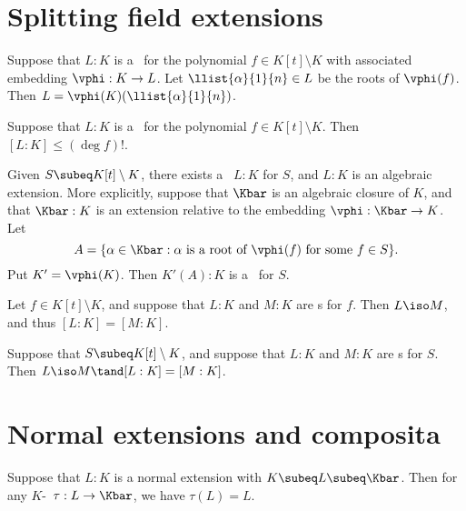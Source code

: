 \documentclass{article}
\begin{document}
\section{Splitting field extensions}
  \begin{tproposition}
    Suppose that \( L:K \) is a \sfe~for the polynomial \( f\in K[t]\setminus K \) with associated embedding \( \vphi:K\to L \). Let \( \llist{\alpha}{1}{n}\in L \) be the roots of \( \vphi(f) \). Then \( L=\vphi(K)(\llist{\alpha}{1}{n}) \).
  \end{tproposition}

  \begin{tproposition}
    Suppose that \( L:K \) is a \sfe~for the polynomial \( f\in K[t]\setminus K \). Then \( [L:K]\leq (\deg f)! \).
  \end{tproposition}

  \begin{tproposition}
    Given \( S\subeq K[t]\setminus K \), there exists a \sfe~\( L:K \) for \( S \), and \( L:K \) is an algebraic extension. More explicitly, suppose that \( \Kbar \) is an algebraic closure of \( K \), and that \( \Kbar:K \) is an extension relative to the embedding \( \vphi:\Kbar\to K \). Let
    \[
      A=\{ \alpha\in \Kbar : \alpha\text{ is a root of } \vphi(f) \text{ for some } f\in S \}.
    \]
    Put \( K'=\vphi(K) \). Then \( K'(A):K \) is a \sfe~for \( S \).
  \end{tproposition}

  \begin{ttheorem}
    Let \( f\in K[t]\setminus K \), and suppose that \( L:K \) and \( M:K \) are \sfe s for \( f \). Then \( L\iso M \), and thus \( [L:K]=[M:K] \).
  \end{ttheorem}

  \begin{ttheorem}
    Suppose that \( S\subeq K[t]\setminus K \), and suppose that \( L:K \) and \( M:K \) are \sfe s for \( S \). Then \( L\iso M\tand [L:K]=[M:K] \).
  \end{ttheorem}

\section{Normal extensions and composita}
  \begin{tproposition}
    Suppose that \( L:K \) is a normal extension with \( K\subeq L\subeq \Kbar \). Then for any \( K \)-\homo~\( \tau:L\to \Kbar \), we have \( \tau(L)=L \).
  \end{tproposition}
\end{document}
